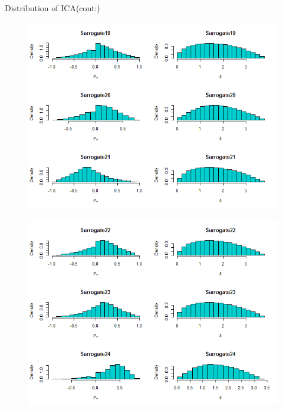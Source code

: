 \documentclass[a4paper,9pt]{beamer}\usepackage[]{graphicx}\usepackage[]{color}
\begin{document}
\begin{frame}{Distribution of ICA(cont:)}
\begin{minipage}{0.3\textwidth}
\begin{figure}[H]
\includegraphics[scale=0.32]{icaplots7.png}
\end{figure}
\end{minipage}
\hfill
\begin{minipage}{0.40\textwidth}
\begin{figure}[H]
\includegraphics[scale=0.32]{icaplots8.png}
\end{figure}
\end{minipage}
\end{frame}
\end{document}
